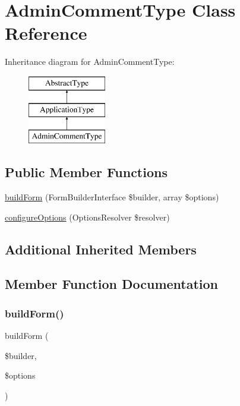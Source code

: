 \hypertarget{class_app_1_1_form_1_1_admin_comment_type}{}\section{Admin\+Comment\+Type Class Reference}
\label{class_app_1_1_form_1_1_admin_comment_type}
Inheritance diagram for Admin\+Comment\+Type\+:\begin{figure}[H]
\begin{center}
\leavevmode
\includegraphics[height=3.000000cm]{class_app_1_1_form_1_1_admin_comment_type}
\end{center}
\end{figure}
\subsection*{Public Member Functions}
\begin{DoxyCompactItemize}
\item 
\mbox{\hyperlink{class_app_1_1_form_1_1_admin_comment_type_a83c3745710374f9c5a1eb0686fe2dfab}{build\+Form}} (Form\+Builder\+Interface \$builder, array \$options)
\item 
\mbox{\hyperlink{class_app_1_1_form_1_1_admin_comment_type_a8ff68a86f5090b5df973286836e46ead}{configure\+Options}} (Options\+Resolver \$resolver)
\end{DoxyCompactItemize}
\subsection*{Additional Inherited Members}


\subsection{Member Function Documentation}
\mbox{\label{class_app_1_1_form_1_1_admin_comment_type_a83c3745710374f9c5a1eb0686fe2dfab}} 
\subsubsection{\texorpdfstring{buildForm()}{buildForm()}}
{\footnotesize\ttfamily build\+Form (\begin{DoxyParamCaption}\item[{Form\+Builder\+Interface}]{\$builder,  }\item[{array}]{\$options }\end{DoxyParamCaption})}

